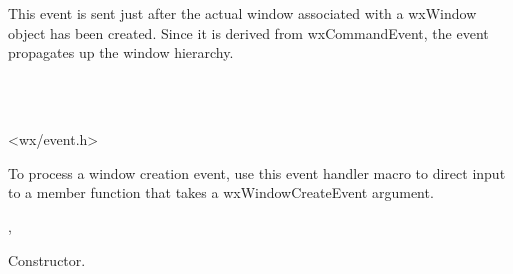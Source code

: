 \section{}\label{wxwindowcreateevent}

This event is sent just after the actual window associated with a wxWindow object
has been created. Since it is derived from wxCommandEvent, the event propagates up
the window hierarchy.


\\
\\


<wx/event.h>




To process a window creation event, use this event handler macro to direct input to a member
function that takes a wxWindowCreateEvent argument.

\twocolwidtha{7cm}
\begin{twocollist}\itemsep=0pt
\end{twocollist}%


,\rtfsp
{}


\label{wxwindowcreateeventctor}


Constructor.


